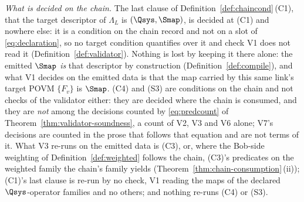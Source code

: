 \begin{remark}\label{rem:chain-and-validator}
\emph{What is decided on the chain.} The last clause of
Definition~\ref{def:chaincond}\,(C1), that the target descriptor of
$\Lambda_L$ is $(\Qsys,\Smap)$, is decided at (C1) and nowhere else: it is a
condition on the chain record and not on a slot of \eqref{eq:declaration}, so
no target condition quantifies over it and check V1 does not read it
(Definition~\ref{def:validator}). Nothing is lost by keeping it there alone:
the emitted $\Smap$ \emph{is} that descriptor by construction
(Definition~\ref{def:compile}), and what V1 decides on the emitted data is
that the map carried by this same link's target POVM $\{F_v\}$ is $\Smap$.
(C4) and (S3) are conditions on the chain and not checks of the validator
either: they are decided where the chain is consumed, and they are \emph{not}
among the decisions counted by \eqref{eq:predcount} of
Theorem~\ref{thm:validator-soundness}, a count of V2, V3 and V6 alone; V7's decisions are
counted in the prose that follows that equation and are not terms of it. What
V3 re-runs on the emitted data is (C3), or, where the Bob-side weighting of
Definition~\ref{def:weighted} follows the chain, (C3)'s predicates on the
weighted family the chain's family yields
(Theorem~\ref{thm:chain-consumption}\,(ii)); (C1)'s last clause is re-run by no
check, V1 reading the maps of the declared $\Qsys$-operator families and no
others; and nothing re-runs (C4) or (S3).


\end{remark}
